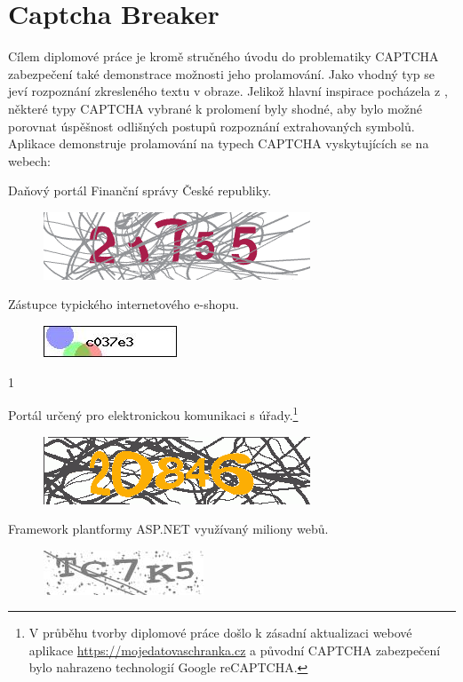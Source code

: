 \documentclass[
  field=ainfp,
  master=true,
  biblatex,
  sourcecodes=false,
  theorems=false,
  glossaries,
  index
]{kidiplom}
\begin{document}
\section{Captcha Breaker}
Cílem diplomové práce je kromě stručného úvodu do problematiky CAPTCHA zabezpečení také demonstrace možnosti jeho prolamování. Jako vhodný typ se jeví rozpoznání zkresleného textu v obraze. Jelikož hlavní inspirace pocházela z \cite{Kopp2016HowTM}, některé typy CAPTCHA vybrané k prolomení byly shodné, aby bylo možné porovnat úspěšnost odlišných postupů rozpoznání extrahovaných symbolů. Aplikace demonstruje prolamování na typech CAPTCHA vyskytujících se na webech:
\begin{description}[align=left]
\item [adiseet.mfcr.cz] Daňový portál Finanční správy České republiky.
\begin{figure}[H]
  \centering
  \includegraphics[scale=0.5]{images/eet.png}
\end{figure}

\item [kamody.cz] Zástupce typického internetového e-shopu.
\begin{figure}[H]
  \centering
  \includegraphics{images/kamody.jpg}
\end{figure}1

\item [mojedatovaschranka.cz] Portál určený pro elektronickou komunikaci s úřady.\footnote{V průběhu tvorby diplomové práce došlo k zásadní aktualizaci webové aplikace \url{https://mojedatovaschranka.cz} a původní CAPTCHA zabezpečení bylo nahrazeno technologií Google reCAPTCHA.}
\begin{figure}[H]
  \centering
  \includegraphics[scale=0.5]{images/datovka.png}
\end{figure}

\item [telerik.com] Framework plantformy ASP.NET využívaný miliony webů.
\begin{figure}[H]
  \centering
  \includegraphics{images/telerik.jpg}
\end{figure}


\end{description}
\end{document}
